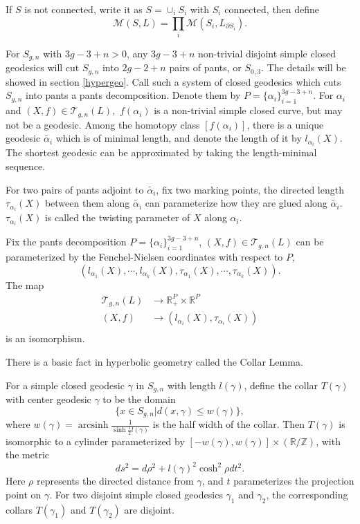 If $S$ is not connected, write it as $S=\cup_iS_i$ with $S_i$ 
connected, then define $$\mathscr{M}(S,L)=\prod_{i}\mathscr{M}(S_i,L_{\partial S_i}).$$

For $S_{g,n}$ with $3g-3+n>0$, any $3g-3+n$ non-trivial disjoint simple closed geodesics will cut $S_{g,n}$ into $2g-2+n$ pairs of pants, or $S_{0,3}$. The details will be showed in section \ref{hypergeo}.  Call such a system of closed geodesics which  cuts $S_{g,n}$ into pants  a pants decomposition. Denote them by $P=\{\alpha_i\}_{i=1}^{3g-3+n}.$ For $\alpha_i$ and $(X,f)\in \mathscr{T}_{g,n}(L),$ $f(\alpha_i)$ is a non-trivial simple closed curve, but may not be a geodesic. Among the homotopy class $[f(\alpha_i)]$, there is  a unique geodesic $\tilde{\alpha_i}$ which is of minimal length, and denote the length of it  by $l_{\alpha_i}(X).$ The shortest geodesic can be approximated by taking the length-minimal sequence.

For two pairs of pants adjoint to $\tilde{\alpha_i}$, fix two marking points,  the directed length $\tau_{\alpha_i}(X)$ between them along $\tilde{\alpha_i}$ can parameterize how they are glued along $\tilde{\alpha_i}$. $\tau_{\alpha_i}(X)$ is called the twisting parameter of $X$ along $\alpha_i$.

Fix the pants decomposition $P=\{\alpha_i\}_{i=1}^{3g-3+n}$, $(X,f)\in \mathscr{T}_{g,n}(L)$ can be parameterized by the Fenchel-Nielsen coordinates with respect to $P$, $$(l_{\alpha_1}(X),\cdots,l_{\alpha_k}(X),\tau_{\alpha_1}(X),\cdots,\tau_{\alpha_k}(X)).$$
The map $$
\begin{aligned}
\mathscr{T}_{g,n}(L)&\to \mathbb{R}_{+}^{P}\times\mathbb{R}^{P}\\
(X,f)&\to (l_{\alpha_i}(X),\tau_{\alpha_i}(X))\\
\end{aligned}
$$
 is an isomorphism.
 
There is a basic fact in hyperbolic geometry called the Collar Lemma. 

\begin{lemma}\label{collarlemma}
  For a simple closed geodesic $\gamma$ in $S_{g,n}$ with length $l(\gamma)$, define  the collar  $T(\gamma)$ with center geodesic $\gamma$ to be the domain  
  $$
  \{x\in S_{g,n}|d(x,\gamma)\leq w(\gamma)\},
  $$
  where $w(\gamma)=\operatorname{arcsinh}\frac{1}{\operatorname{sinh}{\frac{1}{2}l(\gamma)}}$ is the half width of the collar.
  Then $T(\gamma)$ is isomorphic to a cylinder parameterized by $[-w(\gamma),w(\gamma)]\times (\mathbb{R}/\mathbb{Z})$,  with the metric 
$$ ds^2=d\rho^2+l(\gamma)^2\cosh^2\rho dt^2.
$$
Here  $\rho$ represents the directed distance from $\gamma$, and $t$ parameterizes the projection point on $\gamma$.
For two disjoint  simple closed geodesics $\gamma_1$ and $\gamma_2$, the corresponding collars $T(\gamma_1)$ and $T(\gamma_2)$ are disjoint.

\end{lemma}

